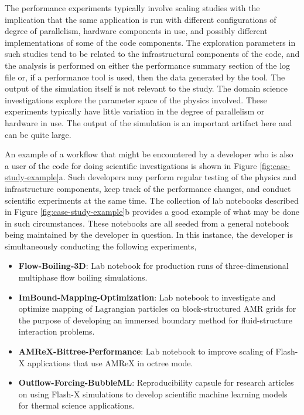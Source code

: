 \documentclass{IEEEcsmag}
\begin{document}
The performance experiments typically involve scaling studies with the implication that the same application is run with different configurations of degree of parallelism, hardware components in use, and possibly different implementations of some of the code components. The exploration parameters in such studies tend to be related to the infrastructural components of the code, and the analysis is performed on either the performance summary section of the log file or, if a performance tool is used, then the data generated by the tool. The output of the simulation itself is not relevant to the study. The domain science investigations explore the parameter space of the physics involved. These experiments typically have little variation in the degree of parallelism or hardware in use. The output of the simulation is an important artifact here and can be quite large. 

An example of a workflow that might be encountered by a developer who is also a user of the code for doing scientific investigations is shown in Figure \ref{fig:case-study-example}a. Such developers may perform regular testing of the physics and infrastructure components, keep track of the performance changes, and conduct scientific experiments at the same time.  {The collection of lab notebooks \cite{Lab-Notebooks} described in Figure \ref{fig:case-study-example}b provides a good example of what may be done in such circumstances}. These notebooks are all seeded from a general notebook \cite{Multiphysics-Simulations} being maintained by the developer in question. In this instance, the developer is simultaneously conducting the following experiments,

\begin{itemize}
    \item \textbf{Flow-Boiling-3D}: Lab notebook for production runs of three-dimensional multiphase flow boiling simulations.
    \item \textbf{ImBound-Mapping-Optimization}: Lab notebook to investigate and optimize mapping of Lagrangian particles on block-structured AMR grids for the purpose of developing an immersed boundary method for fluid-structure interaction problems.
    \item \textbf{AMReX-Bittree-Performance}: Lab notebook to improve scaling of Flash-X applications that use AMReX in octree mode.
    \item \textbf{Outflow-Forcing-BubbleML}: Reproducibility capsule for research articles on using Flash-X simulations to develop scientific machine learning models for thermal science applications. 
\end{itemize}
\end{document}
